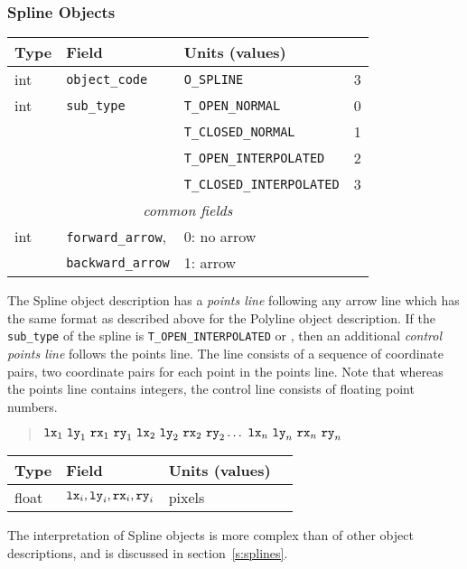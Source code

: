 \subsubsection{Spline Objects}
%
\begin{center}
\begin{tabular} {|l|l|ll|}
\hline
Type	& Field			& Units (values)		&	\\ \hline
\hline
%
int	& {\tt object\_code}	& {\tt O\_SPLINE}		& 3	\\ \hline
%
int	& {\tt sub\_type}	& {\tt T\_OPEN\_NORMAL}		& 0	\\
	&			& {\tt T\_CLOSED\_NORMAL}	& 1	\\
	&			& {\tt T\_OPEN\_INTERPOLATED}	& 2	\\
	&			& {\tt T\_CLOSED\_INTERPOLATED}	& 3	\\ \hline
%
\multicolumn{4}{c}{\it common fields}					\\ \hline
%
int	& {\tt forward\_arrow},	& 0: no arrow			&	\\
	& {\tt backward\_arrow}	& 1: arrow			&	\\ \hline
\end{tabular}
\end{center}
%
The Spline object description has a {\em points line} following
	any arrow line which has the same format as described above
	for the Polyline object description.
If the {\tt sub\_type} of the spline is	{\tt T\_OPEN\_INTERPOLATED} or
	, then an additional
	{\em control points line} follows the points line.
The line consists of a sequence of coordinate pairs, two coordinate pairs
	for each point in the points line.
Note that whereas the points line contains integers, the control line
consists of floating point numbers.
%
\begin{quote}
$
	{\tt lx}_1 ~{\tt ly}_1 ~{\tt rx}_1 ~{\tt ry}_1
	~{\tt lx}_2 ~{\tt ly}_2 ~{\tt rx}_2 ~{\tt ry}_2
	\ldots
	~{\tt lx}_n ~{\tt ly}_n ~{\tt rx}_n ~{\tt ry}_n
$
\end{quote}
%
\begin{center}
\begin{tabular} {|l|l|ll|}
\hline
Type	& Field			& Units (values)	&	\\ \hline
\hline
%
float	& ${\tt lx}_i,{\tt ly}_i,
	   {\tt rx}_i,{\tt ry}_i$& pixels		&	\\ \hline
\end{tabular}
\end{center}
%
The interpretation of Spline objects is more complex than of other
	object descriptions, and is discussed in section~\ref{s:splines}.

